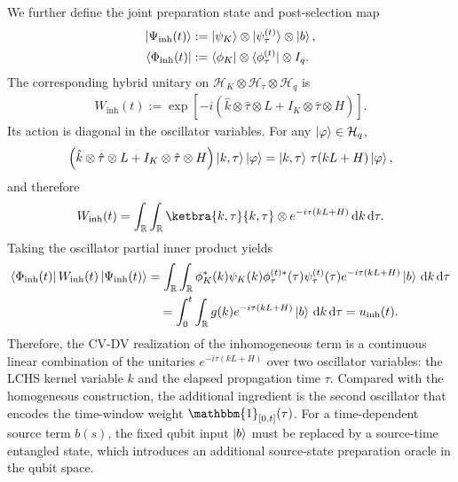 \documentclass{article}
\newcommand{\dd}{\mathrm{d}}
\newcommand{\Rbb}{\mathbb{R}}
\begin{document}
We further define the joint preparation state and post-selection map
\begin{align}
    \ket{\Psi_{\mathrm{inh}}(t)}
    &:= \ket{\psi_K}\otimes \ket{\psi_\tau^{(t)}} \otimes \ket{b}, \\
    \bra{\Phi_{\mathrm{inh}}(t)}
    &:= \bra{\phi_K}\otimes \bra{\phi_\tau^{(t)}} \otimes I_q .
\end{align}
The corresponding hybrid unitary on $\mathcal{H}_K \otimes \mathcal{H}_{\tau} \otimes \mathcal{H}_q$ is
\begin{align}
    W_{\mathrm{inh}}(t)
    := \exp\!\left[-i\left(\hat{k}\otimes \hat{\tau}\otimes L + I_K \otimes \hat{\tau}\otimes H\right)\right].
\end{align}
Its action is diagonal in the oscillator variables. For any $\ket{\varphi} \in \mathcal{H}_q$,
\begin{align}
    \left(\hat{k}\otimes \hat{\tau}\otimes L + I_K \otimes \hat{\tau}\otimes H\right)\ket{k,\tau}\ket{\varphi}
    = \ket{k,\tau}\,\tau(kL+H)\ket{\varphi},
\end{align}
and therefore
\begin{align}
    W_{\mathrm{inh}}(t)
    = \int_{\Rbb}\int_{\Rbb} \ketbra{k,\tau}{k,\tau} \otimes e^{-i\tau(kL+H)} \, \dd k \, \dd \tau .
\end{align}
Taking the oscillator partial inner product yields
\begin{align}
    \bra{\Phi_{\mathrm{inh}}(t)} W_{\mathrm{inh}}(t)\ket{\Psi_{\mathrm{inh}}(t)} &= \int_{\Rbb}\int_{\Rbb}
    \phi_K^*(k)\psi_K(k)\phi_\tau^{(t)*}(\tau)\psi_\tau^{(t)}(\tau)
    e^{-i\tau(kL+H)}\ket{b}
    \, \dd k \, \dd \tau \nonumber \\
    &\quad = \int_0^t \int_{\Rbb} g(k)e^{-i\tau(kL+H)}\ket{b} \, \dd k \, \dd \tau
    = u_{\mathrm{inh}}(t).
    \label{eq:LCHS-inhomo-cv-realization}
\end{align}
Therefore, the CV-DV realization of the inhomogeneous term is a continuous linear combination of the unitaries $e^{-i\tau(kL+H)}$ over two oscillator variables: the LCHS kernel variable $k$ and the elapsed propagation time $\tau$. Compared with the homogeneous construction, the additional ingredient is the second oscillator that encodes the time-window weight $\mathbbm{1}_{[0,t]}(\tau)$. For a time-dependent source term $b(s)$, the fixed qubit input $\ket{b}$ must be replaced by a source-time entangled state, which introduces an additional source-state preparation oracle in the qubit space.
\end{document}
